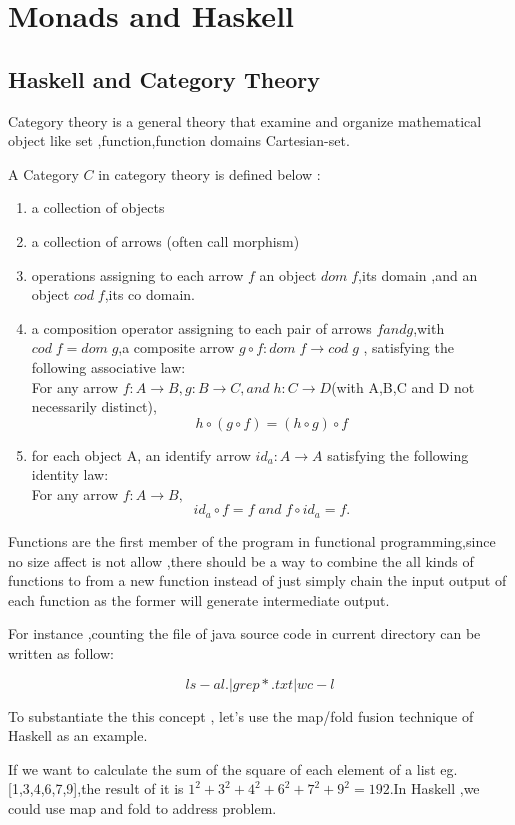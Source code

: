 \chapter{Monads and Haskell}
\section{Haskell and Category Theory}
Category theory is a general theory that examine and organize mathematical object like set ,function,function domains Cartesian-set.

A Category $C $ in category theory is defined below :
\begin{enumerate}
\item a collection of objects 
\item a collection of arrows (often call morphism) 
\item operations assigning to each arrow $f$ an object $dom\;f$,its domain ,and an object $cod\;f$,its co domain.
\item a composition operator assigning to each pair of arrows $f and g$,with $cod\;f = dom\;g$,a composite arrow $ g \circ f:dom\;f \rightarrow  cod\;g$ , satisfying the following associative law: \\
For any arrow $f: A \rightarrow B,g:B \rightarrow C,and\;h: C\rightarrow D$(with A,B,C and D not necessarily distinct),
$$h\circ (g\circ f) = (h\circ g)\circ f$$
\item for each object A, an identify arrow $id_{a}: A \rightarrow A$ satisfying the following identity law:\\
For any arrow $ f: A \rightarrow B,$ 
$$ id_{a} \circ f = f  \;and\;  f\circ id_{a} = f. $$
\end{enumerate}\cite{pierce_basic_1991}

Functions are the first member of the program in functional programming,since no size affect is not allow ,there should be a way to combine the all kinds of functions to from a new function instead of just simply chain the input output of each function as the former will generate intermediate output.


For instance ,counting the file of java source code in current directory can be written as follow:


	$$ ls-al . | grep *.txt| wc -l $$ 
	
	
To substantiate the this concept , let's use the map/fold fusion technique of Haskell as an example.

If we want to calculate the sum of the square of each element of a list eg. [1,3,4,6,7,9],the result of it is  $ 1^2+3^2+4^2+6^2+7^2+9^2=192 $.In Haskell ,we could use map and fold to address problem.

